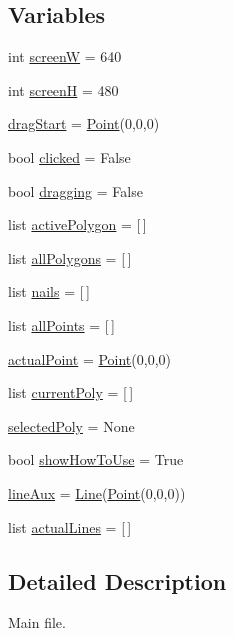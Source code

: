 \subsection*{Variables}
\begin{DoxyCompactItemize}
\item 
int \hyperlink{namespacemain_a985da8a132d11dcc00d693b5c6a62066}{screenW} = 640
\item 
int \hyperlink{namespacemain_ad8989b28561b60a2f903db7303bd7d2f}{screenH} = 480
\item 
\hyperlink{namespacemain_a76ff6cc371da95e41b8b785e77bf79aa}{drag\+Start} = \hyperlink{classgeometry_1_1Point}{Point}(0,0,0)
\item 
bool \hyperlink{namespacemain_adf37c1088b5a3b0bb91496b491b8a83c}{clicked} = False
\item 
bool \hyperlink{namespacemain_afbd095805fe27d150b359c144b7ed863}{dragging} = False
\item 
list \hyperlink{namespacemain_a07b342aae28b10571a2fec275af11d30}{active\+Polygon} = \mbox{[}$\,$\mbox{]}
\item 
list \hyperlink{namespacemain_aefa0fded6ff7576348bd2abf3ab0f8a8}{all\+Polygons} = \mbox{[}$\,$\mbox{]}
\item 
list \hyperlink{namespacemain_a184193594cc4348fd4f60c39b6a01fcc}{nails} = \mbox{[}$\,$\mbox{]}
\item 
list \hyperlink{namespacemain_a5fa631ef1beea1be0731dfac0c03e83e}{all\+Points} = \mbox{[}$\,$\mbox{]}
\item 
\hyperlink{namespacemain_a5f0756d4012f0ed8e06097d7de6b4f46}{actual\+Point} = \hyperlink{classgeometry_1_1Point}{Point}(0,0,0)
\item 
list \hyperlink{namespacemain_add5856c8a2f29c2a313d0a979f3f9386}{current\+Poly} = \mbox{[}$\,$\mbox{]}
\item 
\hyperlink{namespacemain_a1db6f501c5570dc08a064510cb9e71a8}{selected\+Poly} = None
\item 
bool \hyperlink{namespacemain_a52a1046251ec3805410ab8f60b921d57}{show\+How\+To\+Use} = True
\item 
\hyperlink{namespacemain_a8dd8e1c4bcedfacfff187452b92655c6}{line\+Aux} = \hyperlink{classgeometry_1_1Line}{Line}(\hyperlink{classgeometry_1_1Point}{Point}(0,0,0))
\item 
list \hyperlink{namespacemain_aa8e8bb4ccc8ddac3b8b3842e7218a252}{actual\+Lines} = \mbox{[}$\,$\mbox{]}
\end{DoxyCompactItemize}


\subsection{Detailed Description}
Main file. 

